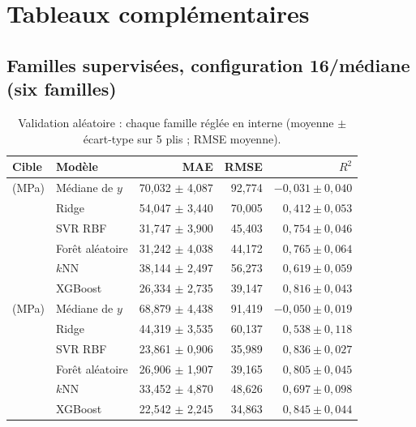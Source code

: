 \section{Tableaux complémentaires}
\label{annexe:tableaux}

\subsection{Familles supervisées, configuration 16/médiane (six familles)}

\begin{table}[htbp]
\centering
\small
\caption{Validation aléatoire : chaque famille réglée en interne (moyenne $\pm$
écart-type sur 5 plis ; RMSE moyenne).}
\label{tab:annexe_aleatoire}
\begin{tabular}{@{}l l r r r@{}}
\toprule
Cible & Modèle & MAE & RMSE & $R^2$ \\
\midrule
\YS{} (MPa) & Médiane de $y$  & 70,032 $\pm$ 4,087 & 92,774 & $-0{,}031 \pm 0{,}040$ \\
            & Ridge           & 54,047 $\pm$ 3,440 & 70,005 & $0{,}412 \pm 0{,}053$ \\
            & SVR RBF         & 31,747 $\pm$ 3,900 & 45,403 & $0{,}754 \pm 0{,}046$ \\
            & Forêt aléatoire & 31,242 $\pm$ 4,038 & 44,172 & $0{,}765 \pm 0{,}064$ \\
            & $k$NN           & 38,144 $\pm$ 2,497 & 56,273 & $0{,}619 \pm 0{,}059$ \\
            & XGBoost         & 26,334 $\pm$ 2,735 & 39,147 & $0{,}816 \pm 0{,}043$ \\
\midrule
\UTS{} (MPa) & Médiane de $y$ & 68,879 $\pm$ 4,438 & 91,419 & $-0{,}050 \pm 0{,}019$ \\
             & Ridge          & 44,319 $\pm$ 3,535 & 60,137 & $0{,}538 \pm 0{,}118$ \\
             & SVR RBF        & 23,861 $\pm$ 0,906 & 35,989 & $0{,}836 \pm 0{,}027$ \\
             & Forêt aléatoire & 26,906 $\pm$ 1,907 & 39,165 & $0{,}805 \pm 0{,}045$ \\
             & $k$NN          & 33,452 $\pm$ 4,870 & 48,626 & $0{,}697 \pm 0{,}098$ \\
             & XGBoost        & 22,542 $\pm$ 2,245 & 34,863 & $0{,}845 \pm 0{,}044$ \\

\end{tabular}
\end{table}
